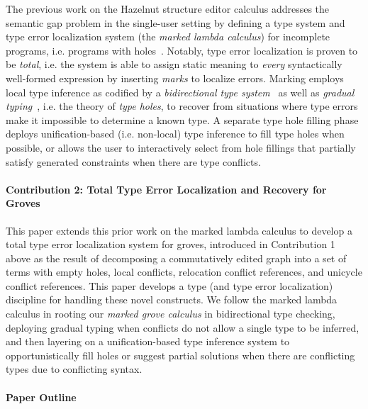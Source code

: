 The previous work on the Hazelnut structure editor calculus addresses the semantic gap problem in the single-user setting by 
defining a type system and type error localization system (the \emph{marked lambda calculus}) for incomplete programs, i.e. programs with holes~\cite{DBLP:journals/pacmpl/ZhaoMDBPO24}. 
Notably, type error localization is proven to be \emph{total}, i.e. the system is able to assign static meaning to \emph{every} syntactically well-formed expression by inserting \emph{marks} to localize errors. Marking employs local type inference as codified by a \emph{bidirectional type system}~\cite{10.1145/3450952} as well as \emph{gradual typing}~\cite{siek2015}, i.e. the theory of \emph{type holes}, to recover from situations where type errors make it impossible to 
determine a known type. 
A separate type hole filling phase deploys unification-based (i.e. non-local) type inference to fill type holes when possible, 
or allows the user to interactively select from hole fillings that partially satisfy generated constraints when there are type conflicts.


\paragraph{Contribution 2: Total Type Error Localization and Recovery for Groves}

This paper extends this prior work on the marked lambda calculus to develop a total type error localization system for groves, introduced in Contribution 1 above as the result of decomposing a commutatively edited graph into a set of terms with empty holes, local conflicts, relocation conflict references, and unicycle conflict references. This paper develops a type (and type error localization) discipline for handling these novel constructs. We follow the marked lambda calculus in rooting our \emph{marked grove calculus} in bidirectional type checking, deploying gradual typing when conflicts do not allow a single type to be inferred, and then layering on a unification-based type inference system to opportunistically fill holes or suggest partial solutions when there are conflicting types due to conflicting syntax.

\paragraph{Paper Outline}

